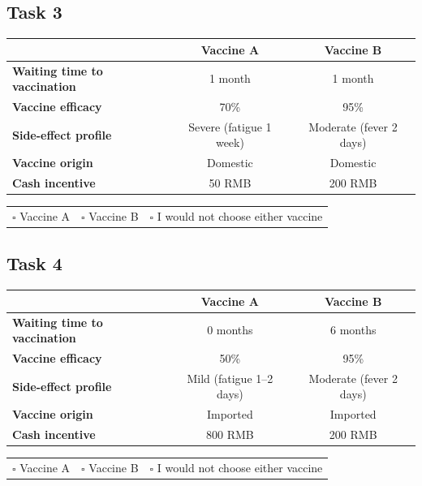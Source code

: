 \documentclass[12pt]{article}
\begin{document}
\subsection*{Task 3}

\begin{center}
\small
\begin{tabular}{@{}p{5cm}cc@{}}
    \toprule
    & \textbf{Vaccine A} & \textbf{Vaccine B} \\
    \midrule
    \textbf{Waiting time to vaccination} & 1 month & 1 month \\
    \textbf{Vaccine efficacy} & 70\% & 95\% \\
    \textbf{Side-effect profile} & Severe (fatigue 1 week) & Moderate (fever 2 days) \\
    \textbf{Vaccine origin} & Domestic & Domestic \\
    \textbf{Cash incentive} & 50 RMB & 200 RMB \\
    \bottomrule
\end{tabular}

\vspace{1em}
\begin{tabular}{@{}ccc@{}}
    $\square$ Vaccine A & $\square$ Vaccine B & $\square$ I would not choose either vaccine \\
\end{tabular}
\end{center}

\newpage

\subsection*{Task 4}

\begin{center}
\small
\begin{tabular}{@{}p{5cm}cc@{}}
    \toprule
    & \textbf{Vaccine A} & \textbf{Vaccine B} \\
    \midrule
    \textbf{Waiting time to vaccination} & 0 months & 6 months \\
    \textbf{Vaccine efficacy} & 50\% & 95\% \\
    \textbf{Side-effect profile} & Mild (fatigue 1--2 days) & Moderate (fever 2 days) \\
    \textbf{Vaccine origin} & Imported & Imported \\
    \textbf{Cash incentive} & 800 RMB & 200 RMB \\
    \bottomrule
\end{tabular}

\vspace{1em}
\begin{tabular}{@{}ccc@{}}
    $\square$ Vaccine A & $\square$ Vaccine B & $\square$ I would not choose either vaccine \\
\end{tabular}
\end{center}
\end{document}
